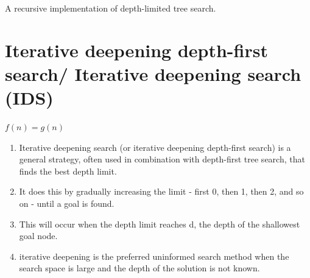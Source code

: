 \begin{algorithm}[H]
\caption{A recursive implementation of depth-limited tree search.}


\end{algorithm}


\section{Iterative deepening depth-first search/ Iterative deepening search (IDS) \cite{aci-1}} \label{Iterative deepening depth-first search/ Iterative deepening search (IDS)}

\begin{center}
    $f(n) = g(n)$
\end{center}

\begin{enumerate}
    \item Iterative deepening search (or iterative deepening depth-first search) is a general strategy, often used in combination with depth-first tree search, that finds the best depth limit. 
    
    \item It does this by gradually increasing the limit - first 0, then 1, then 2, and so on - until a goal is found.
    
    \item This will occur when the depth limit reaches d, the depth of the shallowest goal node.

    \item iterative deepening is the preferred uninformed search method when the search space is large and the depth of the solution is not known.
\end{enumerate}

